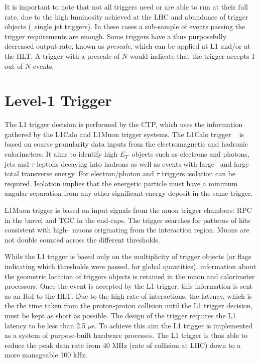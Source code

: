 	It is important to note that not all triggers need or are able to run at their full rate, due to the high luminosity achieved at the \ac{LHC} and abundance of trigger objects (\eg\ single jet triggers). 
	In these cases a sub-sample of events passing the trigger requirements are enough. 
	Some triggers have a thus purposefully decreased output rate, known as \textit{prescale}, which can be applied at \ac{L1} and/or at the \ac{HLT}.
	A trigger with a prescale of $N$ would indicate that the trigger accepts 1 out of $N$ events. 
	 
	\section{Level-1 Trigger}
	\label{sec:L1}
	The \ac{L1} trigger decision is performed by the \ac{CTP}, which uses the information gathered by the \ac{L1Calo} and \ac{L1Muon} trigger systems. The \ac{L1Calo} trigger ~\cite{ATLASJINST,ATLASL1CaloTrig} is based on coarse granularity data inputs from the electromagnetic and hadronic calorimeters. 
	It aims to identify high-$E_T$\ objects such as electrons and photons, jets and $\tau$-leptons decaying into hadrons as well as events with large \met\ and large total transverse energy. 
	For electron/photon and $\tau$ triggers isolation can be required. 
	Isolation implies that the energetic particle must have a minimum angular separation from any other significant energy deposit in the same trigger. 
	
	\ac{L1Muon} trigger is based on input signals from the muon trigger chambers: \ac{RPC} in the barrel and \ac{TGC} in the end-caps. The trigger searches for patterns of hits consistent with high-\pt\ muons originating from the interaction region. %
	Muons are not double counted across the different thresholds.
	
	While the \ac{L1} trigger is based only on the multiplicity of trigger objects (or flags indicating which thresholds were passed, for global quantities), information about the geometric location of triggers objects is retained in the muon and calorimeter processors. Once the event is accepted by the \ac{L1} trigger, this information is sent as an \ac{RoI} to the \ac{HLT}.
	Due to the high rate of interactions, the latency, which is the the time taken from the proton-proton collision until the L1 trigger decision, must be kept as short as possible. The design of the trigger requires the \ac{L1} latency to be less than 2.5 $\mu$s. To achieve this aim the \ac{L1} trigger is implemented as a system of purpose-built hardware processes. The \ac{L1} trigger is thus able to reduce the peak data rate from 40 MHz (rate of collision at LHC) down to a more manageable 100 kHz. 
